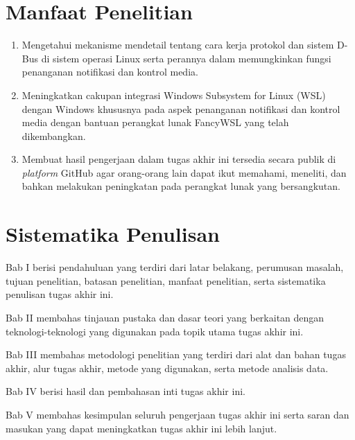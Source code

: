 \section{Manfaat Penelitian}

\begin{enumerate}
    \item Mengetahui mekanisme mendetail tentang cara kerja protokol dan sistem D-Bus di sistem operasi Linux serta perannya dalam memungkinkan fungsi penanganan notifikasi dan kontrol media.

    \item Meningkatkan cakupan integrasi Windows Subsystem for Linux (WSL) dengan Windows khususnya pada aspek penanganan notifikasi dan kontrol media dengan bantuan perangkat lunak FancyWSL yang telah dikembangkan.

    \item Membuat hasil pengerjaan dalam tugas akhir ini tersedia secara publik di \textit{platform} GitHub agar orang-orang lain dapat ikut memahami, meneliti, dan bahkan melakukan peningkatan pada perangkat lunak yang bersangkutan.
\end{enumerate}


\section{Sistematika Penulisan}

\noindent Bab I berisi pendahuluan yang terdiri dari latar belakang, perumusan masalah, tujuan penelitian, batasan penelitian, manfaat penelitian, serta sistematika penulisan tugas akhir ini.

\noindent Bab II membahas tinjauan pustaka dan dasar teori yang berkaitan dengan teknologi-teknologi yang digunakan pada topik utama tugas akhir ini.

\noindent Bab III membahas metodologi penelitian yang terdiri dari alat dan bahan tugas akhir, alur tugas akhir, metode yang digunakan, serta metode analisis data.

\noindent Bab IV berisi hasil dan pembahasan inti tugas akhir ini.

\noindent Bab V membahas kesimpulan seluruh pengerjaan tugas akhir ini serta saran dan masukan yang dapat meningkatkan tugas akhir ini lebih lanjut.
